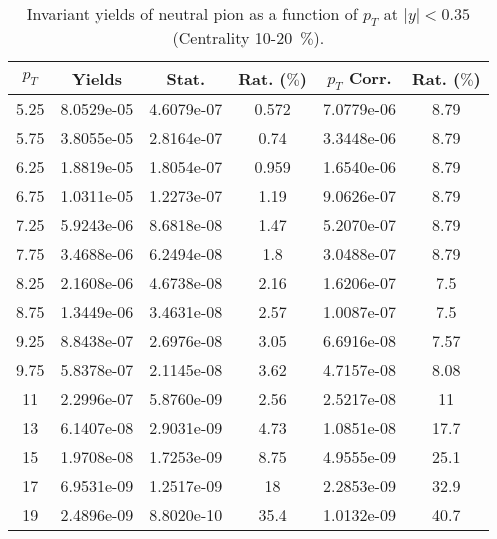             
\begin{table}[!htb]
\centering
\begin{tabular}{|c|c|c|c|c|c|}
\hline
$p_{T}$ & Yields & Stat. & Rat. ($\%$) & $p_{T}$ Corr. & Rat. ($\%$) \\
\hline
5.25 & 8.0529e-05 & 4.6079e-07 & 0.572 & 7.0779e-06 & 8.79 \\ 
5.75 & 3.8055e-05 & 2.8164e-07 & 0.74 & 3.3448e-06 & 8.79 \\ 
6.25 & 1.8819e-05 & 1.8054e-07 & 0.959 & 1.6540e-06 & 8.79 \\ 
6.75 & 1.0311e-05 & 1.2273e-07 & 1.19 & 9.0626e-07 & 8.79 \\ 
7.25 & 5.9243e-06 & 8.6818e-08 & 1.47 & 5.2070e-07 & 8.79 \\ 
7.75 & 3.4688e-06 & 6.2494e-08 & 1.8 & 3.0488e-07 & 8.79 \\ 
8.25 & 2.1608e-06 & 4.6738e-08 & 2.16 & 1.6206e-07 & 7.5 \\ 
8.75 & 1.3449e-06 & 3.4631e-08 & 2.57 & 1.0087e-07 & 7.5 \\ 
9.25 & 8.8438e-07 & 2.6976e-08 & 3.05 & 6.6916e-08 & 7.57 \\ 
9.75 & 5.8378e-07 & 2.1145e-08 & 3.62 & 4.7157e-08 & 8.08 \\ 
11 & 2.2996e-07 & 5.8760e-09 & 2.56 & 2.5217e-08 & 11 \\ 
13 & 6.1407e-08 & 2.9031e-09 & 4.73 & 1.0851e-08 & 17.7 \\ 
15 & 1.9708e-08 & 1.7253e-09 & 8.75 & 4.9555e-09 & 25.1 \\ 
17 & 6.9531e-09 & 1.2517e-09 & 18 & 2.2853e-09 & 32.9 \\ 
19 & 2.4896e-09 & 8.8020e-10 & 35.4 & 1.0132e-09 & 40.7 \\ 
\hline
\end{tabular}
\caption{Invariant yields of neutral pion as a function of $p_{T}$ at $|y|<0.35$ (Centrality 10-20~$\%$).}
\end{table}
            
